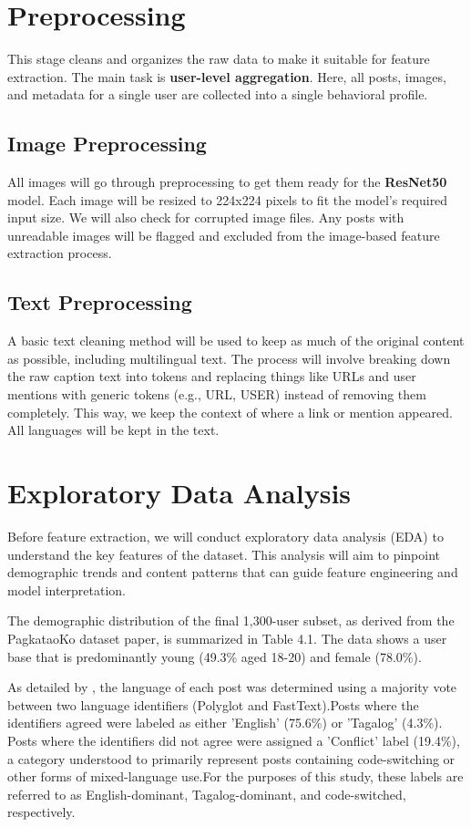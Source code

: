 \section{Preprocessing}
This stage cleans and organizes the raw data to make it suitable for feature extraction. The main task is \textbf{user-level aggregation}. Here, all posts, images, and metadata for a single user are collected into a single behavioral profile. 

\subsection{Image Preprocessing}
All images will go through preprocessing to get them ready for the \textbf{ResNet50} model. Each image will be resized to 224x224 pixels to fit the model’s required input size. We will also check for corrupted image files. Any posts with unreadable images will be flagged and excluded from the image-based feature extraction process.

\subsection{Text Preprocessing}
A basic text cleaning method will be used to keep as much of the original content as possible, including multilingual text. The process will involve breaking down the raw caption text into tokens and replacing things like URLs and user mentions with generic tokens (e.g., URL, USER) instead of removing them completely. This way, we keep the context of where a link or mention appeared. All languages will be kept in the text.


\section{Exploratory Data Analysis}
\label{subsec:eda}

Before feature extraction, we will conduct exploratory data analysis (EDA) to understand the key features of the dataset. This analysis will aim to pinpoint demographic trends and content patterns that can guide feature engineering and model interpretation.

The demographic distribution of the final 1,300-user subset, as derived from the PagkataoKo dataset paper, is summarized in Table 4.1. The data shows a user base that is predominantly young (49.3\% aged 18-20) and female (78.0\%).

As detailed by \citet{tighe_acorda_2022}, the language of each post was determined using a majority vote between two language identifiers (Polyglot and FastText).Posts where the identifiers agreed were labeled as either 'English' (75.6\%) or 'Tagalog' (4.3\%). Posts where the identifiers did not agree were assigned a 'Conflict' label (19.4\%), a category understood to primarily represent posts containing code-switching or other forms of mixed-language use.For the purposes of this study, these labels are referred to as English-dominant, Tagalog-dominant, and code-switched, respectively.

